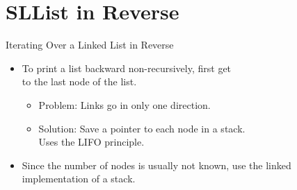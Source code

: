 \documentclass[14pt,aspectratio=1610]{beamer}
\begin{document}


\section{SLList in Reverse}

\begin{frame}{Iterating Over a Linked List in Reverse}
\begin{itemize}
  \item
    To print a list backward non-recursively, first get\\ to the last node of the list.
    \begin{itemize}
      \item
        Problem: Links go in only one direction.
      \item
        Solution: Save a pointer to each node in a stack.\\
        Uses the LIFO principle.
    \end{itemize}
  \item
    Since the number of nodes is usually not known, use the linked implementation of a stack.
\end{itemize}  
\end{frame}
\end{document}
